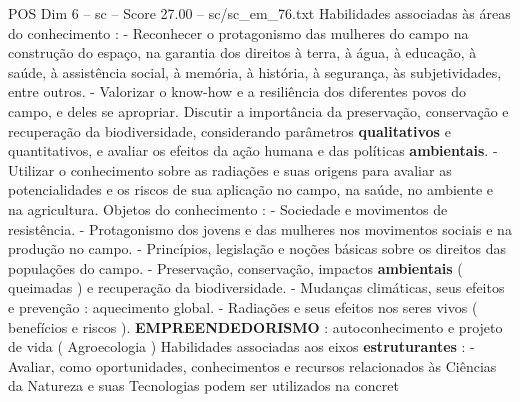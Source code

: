\begin{textsample}{POS Dim 6 – sc – Score 27.00 – sc/sc\_em\_76.txt}
Habilidades associadas às áreas do conhecimento : - Reconhecer o protagonismo das mulheres do campo na construção do espaço, na garantia dos direitos à terra, à água, à educação, à saúde, à assistência social, à memória, à história, à segurança, às subjetividades, entre outros. - Valorizar o know-how e a resiliência dos diferentes povos do campo, e deles se apropriar.
Discutir a importância da preservação, conservação e recuperação da biodiversidade, considerando parâmetros \textbf{qualitativos} e quantitativos, e avaliar os efeitos da ação humana e das políticas \textbf{ambientais}. - Utilizar o conhecimento sobre as radiações e suas origens para avaliar as potencialidades e os riscos de sua aplicação no campo, na saúde, no ambiente e na agricultura.
Objetos do conhecimento : - Sociedade e movimentos de resistência. - Protagonismo dos jovens e das mulheres nos movimentos sociais e na produção no campo. - Princípios, legislação e noções básicas sobre os direitos das populações do campo. - Preservação, conservação, impactos \textbf{ambientais} ( queimadas ) e recuperação da biodiversidade. - Mudanças climáticas, seus efeitos e prevenção : aquecimento global. - Radiações e seus efeitos nos seres vivos ( benefícios e riscos ). \textbf{EMPREENDEDORISMO} : autoconhecimento e projeto de vida ( Agroecologia ) Habilidades associadas aos eixos \textbf{estruturantes} : - Avaliar, como oportunidades, conhecimentos e recursos relacionados às Ciências da Natureza e suas Tecnologias podem ser utilizados na concret

\end{textsample}
